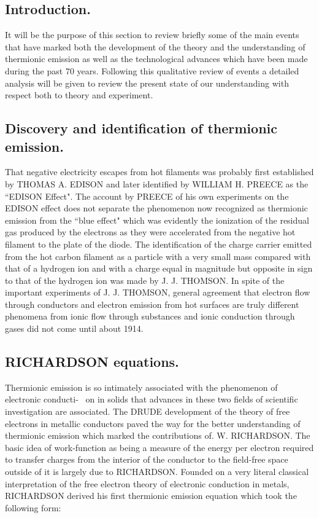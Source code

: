 \documentclass[11pt,a4paper]{article}
\begin{document}
	\subsection{Introduction.}
	
	It will be the purpose of this section to review briefly some
	of the main events that have marked both the development of the theory and
	the understanding of thermionic emission as well as the technological advances
	which have been made during the past 70 years. Following this qualitative
	review of events a detailed analysis will be given to review the present state of
	our understanding with respect both to theory and experiment.
	
	\subsection{Discovery and identification of thermionic emission.}
	
	That negative electricity escapes from hot filaments was probably first established by THOMAS A.
	EDISON and later identified by WILLIAM H. PREECE as the ``EDISON Effect".
	The account by PREECE of his own experiments on the EDISON effect does not
	separate the phenomenon now recognized as thermionic emission from the
	``blue effect" which was evidently the ionization of the residual gas produced
	by the electrons as they were accelerated from the negative hot filament to the
	plate of the diode. The identification of the charge carrier emitted from the hot
	carbon filament as a particle with a very small mass compared with that of a
	hydrogen ion and with a charge equal in magnitude but opposite in sign to that
	of the hydrogen ion was made by J. J. THOMSON. In spite of the important
	experiments of J. J. THOMSON, general agreement that electron flow through
	conductors and electron emission from hot surfaces are truly different phenomena from ionic flow through substances and ionic conduction through gases did not
	come until about 1914.
	
	\subsection{RICHARDSON equations.}
	
	Thermionic emission is so intimately associated
	with the phenomenon of electronic conducti- \ on in solids that advances in these
	two fields of scientific investigation are associated. The DRUDE development
	of the theory of free electrons in metallic conductors paved the way for the
	better understanding of thermionic emission which marked the contributions
	of. W. RICHARDSON. The basic idea of work-function as being a measure of
	the energy per electron required to transfer charges from the interior of the
	conductor to the field-free space outside of it is largely due to RICHARDSON.
	Founded on a very literal classical interpretation of the free electron theory
	of electronic conduction in metals, RICHARDSON derived his first thermionic
	emission equation which took the following form:
	
\end{document}
